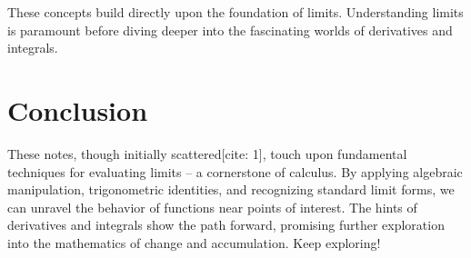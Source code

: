 \documentclass[12pt]{article}
\begin{document}
These concepts build directly upon the foundation of limits. Understanding limits is paramount before diving deeper into the fascinating worlds of derivatives and integrals.

\section{Conclusion}

These notes, though initially scattered[cite: 1], touch upon fundamental techniques for evaluating limits – a cornerstone of calculus. By applying algebraic manipulation, trigonometric identities, and recognizing standard limit forms, we can unravel the behavior of functions near points of interest. The hints of derivatives and integrals show the path forward, promising further exploration into the mathematics of change and accumulation. Keep exploring!
\end{document}
